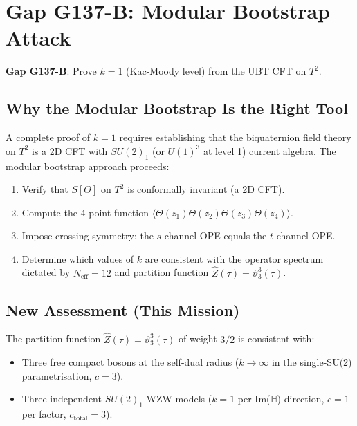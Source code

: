 \documentclass[12pt,a4paper]{article}
\theoremstyle{definition}
\theoremstyle{remark}
\begin{document}
\section{Gap G137-B: Modular Bootstrap Attack}
\label{sec:ar:bootstrap}

\begin{gapbox}
\textbf{Gap G137-B}: Prove $k = 1$ (Kac-Moody level) from the UBT CFT on $T^2$.
\end{gapbox}

\subsection{Why the Modular Bootstrap Is the Right Tool}

A complete proof of $k = 1$ requires establishing that the biquaternion field
theory on $T^2$ is a 2D CFT with $SU(2)_1$ (or $U(1)^3$ at level 1) current algebra.
The modular bootstrap approach proceeds:

\begin{enumerate}
  \item Verify that $S[\Theta]$ on $T^2$ is conformally invariant (a 2D CFT).
  \item Compute the 4-point function $\langle\Theta(z_1)\Theta(z_2)\Theta(z_3)\Theta(z_4)\rangle$.
  \item Impose crossing symmetry: the $s$-channel OPE equals the $t$-channel OPE.
  \item Determine which values of $k$ are consistent with the operator spectrum
        dictated by $N_{\mathrm{eff}} = 12$ and partition function
        $\hat{Z}(\tau) = \vartheta_3^3(\tau)$.
\end{enumerate}

\subsection{New Assessment (This Mission)}

The partition function $\hat{Z}(\tau) = \vartheta_3^3(\tau)$ of weight $3/2$ is
consistent with:
\begin{itemize}
  \item Three free compact bosons at the self-dual radius ($k \to \infty$ in the
        single-SU(2) parametrisation, $c = 3$).
  \item Three independent $SU(2)_1$ WZW models ($k = 1$ per Im($\mathbb{H}$) direction,
        $c = 1$ per factor, $c_{\mathrm{total}} = 3$).
\end{itemize}
\end{document}
